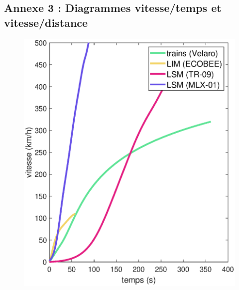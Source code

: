 \documentclass[12pt, a4paper, onecolumn]{article}
\begin{document}
\begin{appendix}
  \pagebreak %
  \subsection{Annexe 3 : Diagrammes vitesse/temps et vitesse/distance}
  \label{annexe 3}

  \begin{figure}[H]
    \centering
    \begin{minipage}[H]{0.49\textwidth}
      \includegraphics[width=\textwidth]{fig/Atv.eps}
    \end{minipage}
    \hfill
    \begin{minipage}[H]{0.49\textwidth}

\end{minipage}
\end{figure}
\end{appendix}
\end{document}
